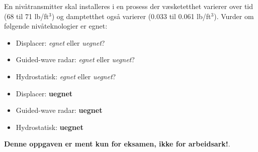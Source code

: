 

En nivåtransmitter skal installeres i en prosess der væsketetthet varierer over tid (68 til 71 lb/ft$^{3}$) og damptetthet også varierer (0.033 til 0.061 lb/ft$^{3}$). Vurder om følgende nivåteknologier er egnet:

\begin{itemize}
\item{} Displacer: {\it egnet} eller {\it uegnet}?
\vskip 10pt
\item{} Guided-wave radar: {\it egnet} eller {\it uegnet}?
\vskip 10pt
\item{} Hydrostatisk: {\it egnet} eller {\it uegnet}?
\end{itemize}







\begin{itemize}
\item{} Displacer: {\bf uegnet}
\vskip 10pt
\item{} Guided-wave radar: {\bf uegnet}
\vskip 10pt
\item{} Hydrostatisk: {\bf uegnet}
\end{itemize}







{\bf Denne oppgaven er ment kun for eksamen, ikke for arbeidsark!}.


